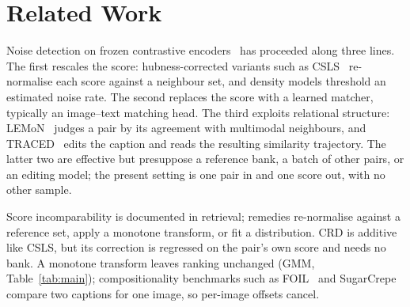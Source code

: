 \section{Related Work}
\label{sec:related}

Noise detection on frozen contrastive encoders~\cite{radford2021clip,li2022blip,zhai2023siglip}
has proceeded along three lines. The first rescales the score: hubness-corrected
variants such as CSLS~\cite{conneau2018csls} re-normalise each score against a
neighbour set, and density models threshold an estimated noise rate. The second
replaces the score with a learned matcher, typically an image--text matching head.
The third exploits relational structure: LEMoN~\cite{zhang2024lemon} judges a pair
by its agreement with multimodal neighbours, and TRACED~\cite{afriat2025traced}
edits the caption and reads the resulting similarity trajectory. The latter two are
effective but presuppose a reference bank, a batch of other pairs, or an editing
model; the present setting is one pair in and one score out, with no other sample.

Score incomparability is documented in retrieval; remedies re-normalise against a
reference set, apply a monotone transform, or fit a distribution. CRD is additive like
CSLS, but its correction is regressed on the pair's own score and needs no bank. A
monotone transform leaves ranking unchanged (GMM, Table~\ref{tab:main});
compositionality benchmarks such as FOIL~\cite{shekhar2017foil} and
SugarCrepe~\cite{hsieh2023sugarcrepe} compare two captions for one image, so
per-image offsets cancel.

